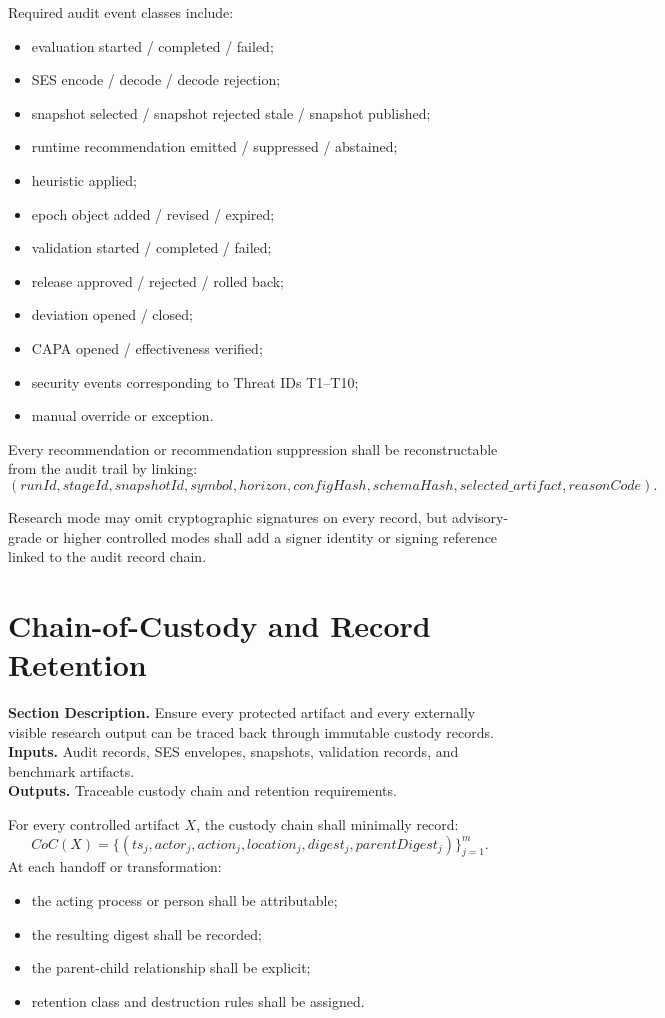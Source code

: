\documentclass[11pt]{report}
\newcommand{\meta}[3]{\textbf{Section Description.} #1\\
\textbf{Inputs.} #2\\
\textbf{Outputs.} #3\par}
\begin{document}
Required audit event classes include:
\begin{itemize}
\item evaluation started / completed / failed;
\item SES encode / decode / decode rejection;
\item snapshot selected / snapshot rejected stale / snapshot published;
\item runtime recommendation emitted / suppressed / abstained;
\item heuristic applied;
\item epoch object added / revised / expired;
\item validation started / completed / failed;
\item release approved / rejected / rolled back;
\item deviation opened / closed;
\item CAPA opened / effectiveness verified;
\item security events corresponding to Threat IDs T1--T10;
\item manual override or exception.
\end{itemize}

Every recommendation or recommendation suppression shall be reconstructable from the audit trail by linking:
\[
(runId,stageId,snapshotId,symbol,horizon,configHash,schemaHash,selected\_artifact,reasonCode).
\]

Research mode may omit cryptographic signatures on every record, but advisory-grade or higher controlled modes shall add a signer identity or signing reference linked to the audit record chain.


\section{Chain-of-Custody and Record Retention}
\meta{Ensure every protected artifact and every externally visible research output can be traced back through immutable custody records.}{Audit records, SES envelopes, snapshots, validation records, and benchmark artifacts.}{Traceable custody chain and retention requirements.}

For every controlled artifact $X$, the custody chain shall minimally record:
\[
CoC(X)=\{(ts_j, actor_j, action_j, location_j, digest_j, parentDigest_j)\}_{j=1}^{m}.
\]
At each handoff or transformation:
\begin{itemize}
\item the acting process or person shall be attributable;
\item the resulting digest shall be recorded;
\item the parent-child relationship shall be explicit;
\item retention class and destruction rules shall be assigned.
\end{itemize}
\end{document}

